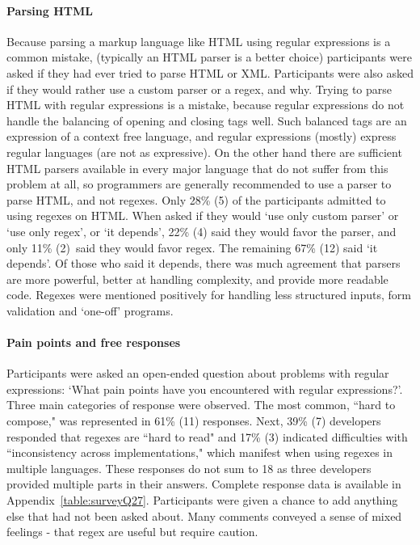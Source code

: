 \paragraph{Parsing HTML}\label{sec:surveyParsingHTML}
Because parsing a markup language like HTML using regular expressions is a common mistake, (typically an HTML parser is a better choice) participants were asked if they had ever tried to parse HTML or XML.  Participants were also asked if they would rather use a custom parser or a regex, and why.  Trying to parse HTML with regular expressions is a mistake, because regular expressions do not handle the balancing of  opening and closing tags well.  Such balanced tags are an expression of a context free language, and regular expressions (mostly) express regular languages (are not as expressive).  On the other hand there are sufficient HTML parsers available in every major language that do not suffer from this problem at all, so programmers are generally recommended to use a parser to parse HTML, and not regexes.  Only 28\% (5) of the participants admitted to using regexes on HTML.  When asked if they would `use only custom parser' or `use only regex', or `it depends', 22\% (4) said they would favor the parser, and only 11\% (2) said they would favor regex.  The remaining 67\% (12) said `it depends'.  Of those who said it depends, there was much agreement that parsers are more powerful, better at handling complexity, and provide more readable code.  Regexes were mentioned positively for handling less structured inputs, form validation and `one-off' programs.

\paragraph{Pain points and free responses}\label{sec:painPoints}
Participants were asked an open-ended question about problems with regular expressions: `What pain points have you encountered with regular expressions?'.  Three main categories of response were observed. The most common, ``hard to compose," was represented in 61\% (11) responses. Next, 39\% (7) developers responded that regexes are ``hard to read" and 17\% (3) indicated difficulties with ``inconsistency across implementations," which manifest when using regexes in multiple languages. These responses do not sum to 18 as three developers provided multiple parts in their answers.  Complete response data is available in Appendix~\ref{table:surveyQ27}.  Participants were given a chance to add anything else that had not been asked about.  Many comments conveyed a sense of mixed feelings - that regex are useful but require caution.

